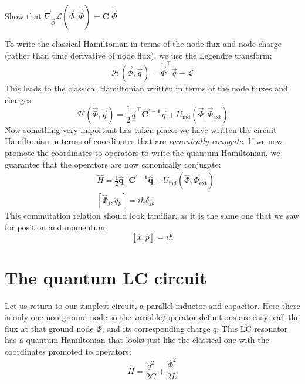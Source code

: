 \begin{exercise}
    Show that $\vec{\nabla}_{\dot{\vec{\Phi}}}\mathcal{L}(\vec\Phi,\dot{\vec{\Phi}}) = \mathbf{C^\prime}\dot{\vec{\Phi}}$ \\
\end{exercise}

To write the classical Hamiltonian in terms of the node flux and node charge (rather than time derivative of node flux), we use the Legendre transform:
\begin{equation}
    \mathcal{H}(\vec\Phi,\vec{q})= \dot{\vec{\Phi}}^\top \vec{q}-\mathcal{L}
\end{equation}
This leads to the classical Hamiltonian written in terms of the node fluxes and charges:
\begin{equation}
\label{eq:nodeHamClass}
    \mathcal{H}(\vec\Phi,\vec{q}) = \frac{1}{2}\vec{q}^\top\mathbf{C^{\prime-1}}\vec{q} + U_\mathrm{ind}(\vec{\Phi}, \vec{\Phi}_\mathrm{ext})
\end{equation}
Now something very important has taken place: we have written the circuit Hamiltonian in terms of coordinates that are \textit{canonically conugate}. If we now promote the coordinates to operators to write the quantum Hamiltonian, we guarantee that the operators are now canonically conjugate:
\begin{align}
&\hat{H} = \frac{1}{2}\mathbf{\hat{q}}^\top\mathbf{C^{\prime-1}}\mathbf{\hat{q}} + U_\mathrm{ind}(\hat{\Phi}, \vec{\Phi}_\mathrm{ext})  \label{eq:nodeHamQuant}\\%
&\left[\hat{\Phi}_j,\hat{q}_k\right] = i\hbar\delta_{jk}
\end{align}
This commutation relation should look familiar, as it is the same one that we saw for position and momentum:
\begin{equation*}
\left[\hat{x},\hat{p}\right] = i \hbar
\end{equation*}



\section{The quantum LC circuit}
Let us return to our simplest circuit, a parallel inductor and capacitor. Here there is only one non-ground node so the variable/operator definitions are easy: call the flux at that ground node $\Phi$, and its corresponding charge $q$. This LC resonator has a quantum Hamiltonian that looks just like the classical one with the coordinates promoted to operators:
\begin{equation}
\hat{H} = \frac{\hat{q}^2}{2 C} + \frac{\hat{\Phi}^2}{2 L}
\end{equation}

